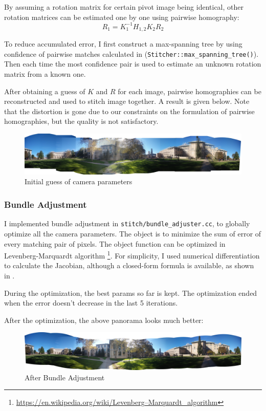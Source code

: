 By assuming a rotation matrix for certain pivot image being identical,
other rotation matrices
can be estimated one by one using pairwise homography:
\[ R_1 = K_1^{-1}H_{1,2}K_2R_2\]

To reduce accumulated error,
I first construct a max-spanning tree by using
confidence of pairwise matches calculated in  (\verb|Stitcher::max_spanning_tree()|).
Then each time the most confidence pair is used to estimate
an unknown rotation matrix from a known one.

After obtaining a guess of $K$ and $R$ for each image,
pairwise homographies can be reconstructed and used to
stitch image together. A result is given below. Note that
the distortion is gone due to our constraints on the formulation
of pairwise homographies, but the quality is not satisfactory.
\begin{figure}[H]
  \centering
  \includegraphics[width=\textwidth]{res/initial_camera.jpg}
  \caption{Initial guess of camera parameters}
\end{figure}

\subsubsection{Bundle Adjustment}

I implemented bundle adjustment in \verb|stitch/bundle_adjuster.cc|,
to globally optimize all the camera parameters.
The object is to minimize the sum of error of every matching pair of pixels.
The object function can be optimized in Levenberg-Marquardt algorithm
\footnote{\url{https://en.wikipedia.org/wiki/Levenberg–Marquardt_algorithm}}.
For simplicity, I used numerical differentiation to calculate
the Jacobian, although a closed-form formula is available,
as shown in \cite{panoramic-sift}.

During the optimization, the best params so far is kept.
The optimization ended when the error doesn't decrease
in the last 5 iterations.

After the optimization, the above panorama looks much better:
\begin{figure}[H]
  \centering
  \includegraphics[width=\textwidth]{res/after-ba.jpg}
  \caption{After Bundle Adjustment}
\end{figure}

